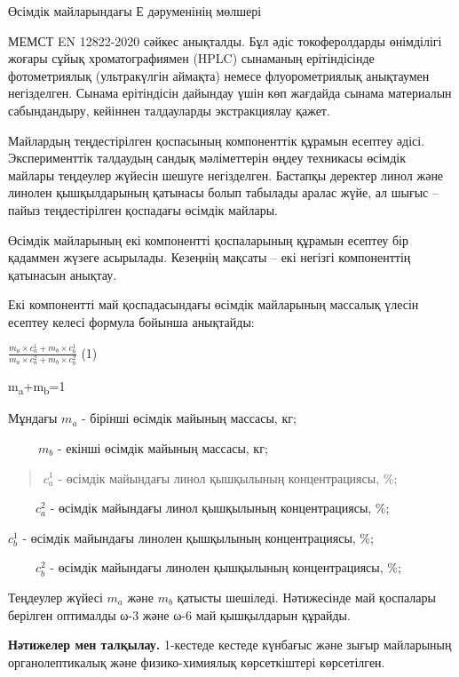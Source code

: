 \begin{multicols}{2}
Өсімдік майларындағы Е дәруменінің мөлшері

МЕМСТ EN 12822-2020 сәйкес анықталды. Бұл әдіс токоферолдарды өнімділігі
жоғары сұйық хроматографиямен (HPLC) сынаманың ерітіндісінде
фотометриялық (ультракүлгін аймақта) немесе флуорометриялық анықтаумен
негізделген. Сынама ерітіндісін дайындау үшін көп жағдайда сынама
материалын сабындандыру, кейіннен талдауларды экстракциялау қажет.

Майлардың теңдестірілген қоспасының компоненттік құрамын есептеу әдісі.
Эксперименттік талдаудың сандық мәліметтерін өңдеу техникасы өсімдік
майлары теңдеулер жүйесін шешуге негізделген. Бастапқы деректер линол
және линолен қышқылдарының қатынасы болып табылады аралас жүйе, ал шығыс
-- пайыз теңдестірілген қоспадағы өсімдік майлары.

Өсімдік майларының екі компонентті қоспаларының құрамын есептеу бір
қадаммен жүзеге асырылады. Кезеңнің мақсаты -- екі негізгі компоненттің
қатынасын анықтау.

Екі компонентті май қоспадасындағы өсімдік майларының массалық үлесін
есептеу келесі формула бойынша анықтайды:

\(\frac{m_{a} \times c_{a}^{1} + m_{b} \times c_{b}^{1}}{m_{a} \times c_{a}^{2} + m_{b} \times c_{b}^{2}}\)
(1)

m\textsubscript{a}+m\textsubscript{b}=1

Мұндағы \(m_{a}\) - бірінші өсімдік майының массасы, кг;

\({\ \ \ \ \ \ \ \ \ \ \ m}_{b}\) - екінші өсімдік майының массасы, кг;

\begin{quote}
\(c_{a}^{1}\) - өсімдік майындағы линол қышқылының концентрациясы, \%;
\end{quote}

\({\ \ \ \ \ \ \ \ \ \ c}_{a}^{2}\) - өсімдік майындағы линол қышқылының
концентрациясы, \%;

\(c_{b}^{1}\) - өсімдік майындағы линолен қышқылының концентрациясы, \%;

\(\ \ \ \ \ \ \ \ \ \ c_{b}^{2}\) - өсімдік майындағы линолен қышқылының
концентрациясы, \%;

Теңдеулер жүйесі \(m_{a}\) және \(m_{b}\) қатысты шешіледі. Нәтижесінде
май қоспалары берілген оптималды ω-3 және ω-6 май қышқылдарын құрайды.

{\bfseries Нәтижелер мен талқылау.} 1-кестеде кестеде күнбағыс және зығыр
майларының органолептикалық және физико-химиялық көрсеткіштері
көрсетілген.
\end{multicols}

